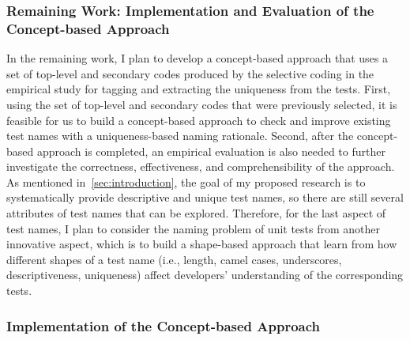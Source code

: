 \subsubsection{Remaining Work: Implementation and Evaluation of the Concept-based Approach}
\label{sec:remaining-work}


In the remaining work, I plan to develop a concept-based approach that uses a set of top-level and secondary codes produced by the selective coding in the empirical study for tagging and extracting the uniqueness from the tests.
%
First, using the set of top-level and secondary codes that were previously selected, it is feasible for us to build a concept-based approach to check and improve existing test names with a uniqueness-based naming rationale.
%
Second, after the concept-based approach is completed, an empirical evaluation is also needed to further investigate the correctness, effectiveness, and comprehensibility of the approach.
%
As mentioned in~\cref{sec:introduction}, the goal of my proposed research is to systematically provide descriptive and unique test names, so there are still several attributes of test names that can be explored.
%
Therefore, for the last aspect of test names, I plan to consider the naming problem of unit tests from another innovative aspect, which is to build a shape-based approach that learn from how different shapes of a test name (i.e., length, camel cases, underscores, descriptiveness, uniqueness) affect developers' understanding of the corresponding tests.

\subsubsection{Implementation of the Concept-based Approach}


